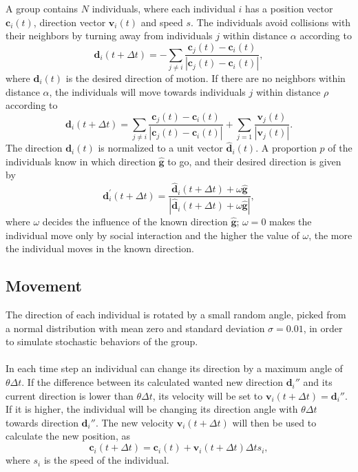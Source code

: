A group contains $N$ individuals, where each individual $i$ has a position vector $\boldsymbol{c}_i(t)$, direction vector $\boldsymbol{v}_i(t)$ and speed $s$. 
The individuals avoid collisions with their neighbors by turning away from individuals $j$ within distance $\alpha$ according to
\begin{equation}
\boldsymbol{d}_i (t+\Delta t) = - \sum_{j \neq i} \frac{\boldsymbol{c}_j (t) - \boldsymbol{c}_i (t)}{|\boldsymbol{c}_j (t) - \boldsymbol{c}_i (t) |},
\label{eq:repulsion}
\end{equation}
where $\boldsymbol{d}_i(t)$ is the desired direction of motion. 
If there are no neighbors within distance $\alpha$, the individuals will move towards individuals $j$ within distance $\rho$ according to
\begin{equation}
\boldsymbol{d}_i (t+\Delta t) = \sum_{j \neq i} \frac{\boldsymbol{c}_j (t)- \boldsymbol{c}_i (t)}{|\boldsymbol{c}_j (t) - \boldsymbol{c}_i (t)|} + \sum_{j = 1} \frac{\boldsymbol{v}_j (t)}{|\boldsymbol{v}_j (t)|}.
\label{eq:attraction}
\end{equation}
The direction $\boldsymbol{d}_i(t)$ is normalized to a unit vector $\hat{\boldsymbol{d}}_i(t)$. 
A proportion $p$ of the individuals know in which direction $\hat{\boldsymbol{g}}$ to go, and their desired direction is given by
\begin{equation}
\boldsymbol{d}_i^\prime (t+\Delta t) = \frac{\hat{\boldsymbol{d}}_i (t+\Delta t) + \omega \hat{\boldsymbol{g}}}{|\hat{\boldsymbol{d}}_i (t+\Delta t) + \omega \hat{\boldsymbol{g}}|},
\label{eq:attraction}
\end{equation}
where $\omega$ decides the influence of the known direction $\hat{\boldsymbol{g}}$; $\omega=0$ makes the individual move only by social interaction and the higher the value of $\omega$, the more the individual moves in the known direction.

\subsection{Movement} %
\label{sub:movement}
The direction of each individual is rotated by a small random angle, picked from a normal distribution with mean zero and standard deviation $\sigma = 0.01$, in order to simulate stochastic behaviors of the group.
\\\\
In each time step an individual can change its direction by a maximum angle of $\theta \Delta t$. 
If the difference between its calculated wanted new direction $\boldsymbol{d}_i''$ and its current direction is lower than $\theta \Delta t$, its velocity will be set to $\boldsymbol{v}_i(t + \Delta t) = \boldsymbol{d}_i''$.
If it is higher, the individual will be changing its direction angle with $\theta \Delta t$ towards direction $\boldsymbol{d}_i''$. 
The new velocity $\boldsymbol{v}_i(t + \Delta t)$ will then be used to calculate the new position, as 
\begin{equation}
	\boldsymbol{c}_i(t+\Delta t) = \boldsymbol{c}_i(t) + \boldsymbol{v}_i(t + \Delta t)\Delta t s_i,
\end{equation}
where $s_i$ is the speed of the individual.

